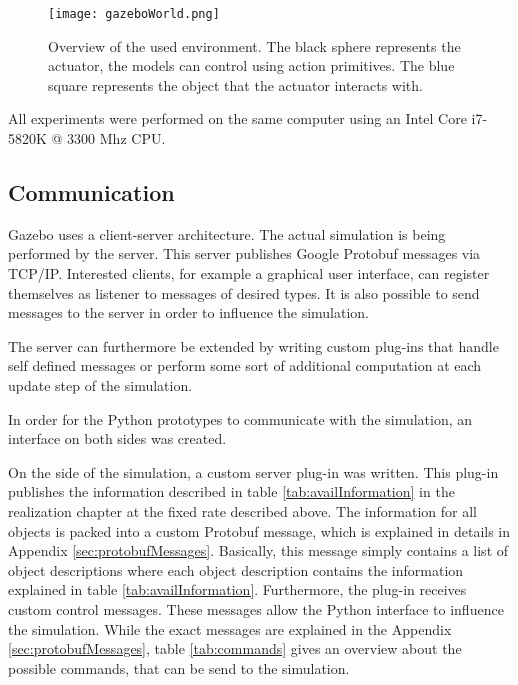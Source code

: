 \begin{figure} 
	\centering
	\texttt{[image: gazeboWorld.png]} 
	\caption{Overview of the used environment. The black sphere represents the actuator, the models can control using action primitives. The blue square represents the object that the actuator interacts with.}
	\label{fig:gazeboWorld}
\end{figure}

All experiments were performed on the same computer using an Intel Core i7-5820K @ 3300 Mhz CPU. 

\subsection{Communication}
Gazebo uses a client-server architecture. The actual simulation is being performed by the server.
This server publishes Google Protobuf \cite{protobuf} messages via TCP/IP. Interested clients, for example a graphical user interface, can register themselves as listener to messages of desired types. 
It is also possible to send messages to the server in order to influence the simulation. 

The server can furthermore be extended by writing custom plug-ins that handle self defined messages or perform some sort of additional computation at each update step of the simulation. 

In order for the Python prototypes to communicate with the simulation, an interface on both sides was created.

On the side of the simulation, a custom server plug-in was written. This plug-in publishes the information described in table \ref{tab:availInformation} in the realization chapter at the fixed rate described above. 
The information for all objects is packed into a custom Protobuf message, which is explained in details in Appendix \ref{sec:protobufMessages}. Basically, this message simply contains a list of object descriptions where each object description contains the information explained in table \ref{tab:availInformation}.
Furthermore, the plug-in receives custom control messages. These messages allow the Python interface to influence the simulation.
While the exact messages are explained in the Appendix \ref{sec:protobufMessages}, table \ref{tab:commands} gives an overview about the possible commands, that can be send to the simulation.

